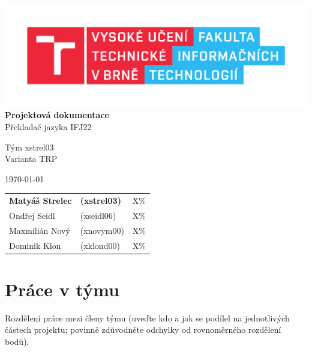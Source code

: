 \documentclass[11pt,a4paper]{article}
\begin{document}
\begin{titlepage}
	\begin{center}
		\includegraphics[scale=0.65]{include/fit.pdf} \\
		
		\LARGE{
			\textbf{
				Projektová dokumentace} \\
			Překladač jazyka IFJ22} \\
		                
		\vspace{2cm}
		            
		\Large{
			Tým xstrel03 \\
			Varianta TRP \\
		}
		                
		\vspace{2cm}
		            
		\normalsize{}
		\today{}
		
		\vspace{2cm}
		
		\begin{tabular}{l l l}
			\textbf{Matyáš Strelec} & \textbf{(xstrel03)} & \quad X\% \\
			Ondřej Seidl             & (xseidl06)          & \quad X\% \\
			Maxmilián Nový          & (xnovym00)          & \quad X\% \\
			Dominik Klon              & (xklond00)          & \quad X\% \\
		\end{tabular}
	\end{center}
\end{titlepage}

\pagebreak{}

\tableofcontents

\pagebreak{}

\section{Práce v týmu}
Rozdělení práce mezi členy týmu (uveďte kdo a jak se podílel na jednotlivých
částech projektu; povinně zdůvodněte odchylky od rovnoměrného rozdělení bodů).
    
\end{document}
